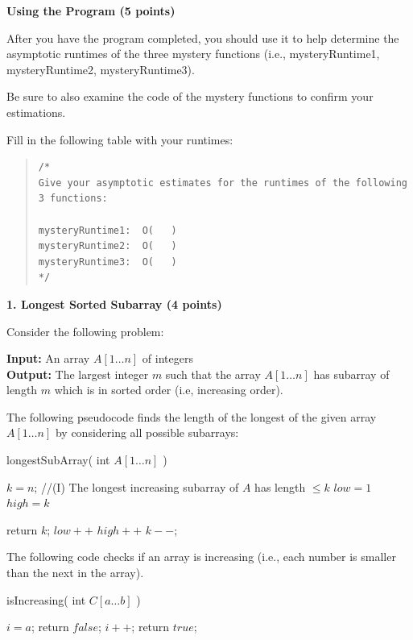 \documentclass[12pt]{elsart}
\begin{document}
{\bf Using the Program (5 points)}

After you have the program completed, you should use it to help determine the asymptotic runtimes of the three mystery functions (i.e., mysteryRuntime1, mysteryRuntime2, mysteryRuntime3).   

Be sure to also examine the code of the mystery functions to confirm your estimations.

Fill in the following table with your runtimes:

\begin{quote}
\small
\begin{verbatim}
/*
Give your asymptotic estimates for the runtimes of the following 3 functions:

mysteryRuntime1:  O(   )
mysteryRuntime2:  O(   )
mysteryRuntime3:  O(   )
*/
\end{verbatim}
\end{quote}

{\bf 1. Longest Sorted Subarray (4 points)}

Consider the following problem:

{\bf Input:} An array $A[1 \ldots n]$ of integers \\
{\bf Output:} The largest integer $m$ such that the array $A[1 \ldots n]$ has subarray of length $m$ which is in sorted order (i.e, increasing order).

The following pseudocode finds the length of the longest of the given array $A[1\ldots n]$ by considering all possible subarrays:

\begin{algorithm}
\caption{longestSubArray( int $A[1\ldots n]$ )}
 \begin{algorithmic}[1]
 \State $k = n$;
 \State //(I) The longest increasing subarray of $A$ has length $\leq k$
  \State $low = 1$
 \State $high = k$

\State return $k$;
\EndIf
       \State $low++$
       \State $high++$
    \EndWhile
    \State $k--$;
  \EndWhile
\end{algorithmic}
\end{algorithm}

The following code checks if an array is increasing (i.e., each number is smaller than the next in the array).

\begin{algorithm}
\caption{isIncreasing( int $C[a\ldots b]$ )}
 \begin{algorithmic}[1]
 \State $i = a$;
\State return $false$;
\EndIf
   \State $i++$;
 \EndWhile
\State return $true$;
\end{algorithmic}
\end{algorithm}
\end{document}
